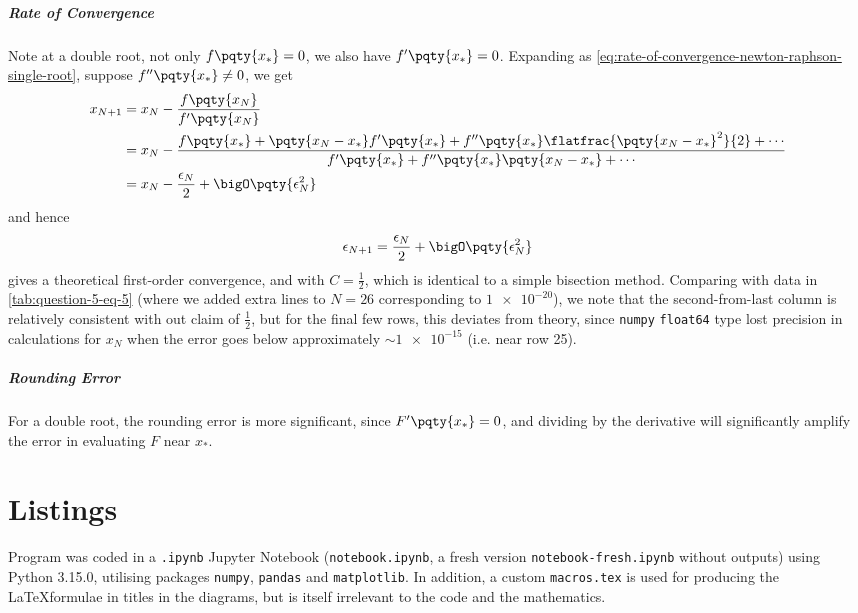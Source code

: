 \documentclass{article}
\begin{document}
\subparagraph{Rate of Convergence} Note at a double root, not only \(f\pqty{x_{\ast}} = 0\), we also have \(f'\pqty{x_{\ast}} = 0\). Expanding as \autoref{eq:rate-of-convergence-newton-raphson-single-root}, suppose \(f''\pqty{x_{\ast}} \neq 0\), we get
\begin{equation}
    \begin{aligned}
        x_{N + 1} &= x_N - \frac{f\pqty{x_N}}{f'\pqty{x_N}} \\
        &= x_N - \frac{f\pqty{x_\ast} + \pqty{x_N - x_{\ast}} f'
        \pqty{x_{\ast}} + f''\pqty{x_{\ast}}\flatfrac{\pqty{x_N - x_{\ast}}^2}{2} + \cdots}{f'\pqty{x_\ast} + f''\pqty{x_{\ast}}\pqty{x_N - x_{\ast}} + \cdots} \\
        &= x_N - \frac{\epsilon_N}{2} + \bigO\pqty{\epsilon_N^2}
    \end{aligned}
\end{equation}
and hence
\begin{equation}
    \epsilon_{N + 1} = \frac{\epsilon_N}{2} + \bigO\pqty{\epsilon_N^2}
\end{equation}
gives a theoretical first-order convergence, and with \(C = \frac{1}{2}\), which is identical to a simple bisection method. Comparing with data in \autoref{tab:question-5-eq-5} (where we added extra lines to \(N = 26\) corresponding to \(\num{1e-20}\)), we note that the second-from-last column is relatively consistent with out claim of \(\frac{1}{2}\), but for the final few rows, this deviates from theory, since \verb|numpy| \verb|float64| type lost precision in calculations for \(x_N\) when the error goes below approximately \(\sim \num{1e-15}\) (i.e. near row 25).

\begin{table}[ht!]
    \centering
    \caption{Data for Convergence of \(f\pqty{x} = x^3 - 8.5 x^2 + 20x - 8\), \(x_0 = 5\)}
    \label{tab:question-5-eq-5}%
    
\end{table}

\subparagraph{Rounding Error} For a double root, the rounding error is more significant, since \(F'\pqty{x_{\ast}} = 0\), and dividing by the derivative will significantly amplify the error in evaluating \(F\) near \(x_{\ast}\).

\clearpage
\appendix
\section{Listings}

Program was coded in a \verb|.ipynb| Jupyter Notebook (\verb|notebook.ipynb|, a fresh version \verb|notebook-fresh.ipynb| without outputs) using Python 3.15.0, utilising packages \verb|numpy|, \verb|pandas| and \verb|matplotlib|. In addition, a custom \verb|macros.tex| is used for producing the \LaTeX formulae in titles in the diagrams, but is itself irrelevant to the code and the mathematics.
\end{document}
